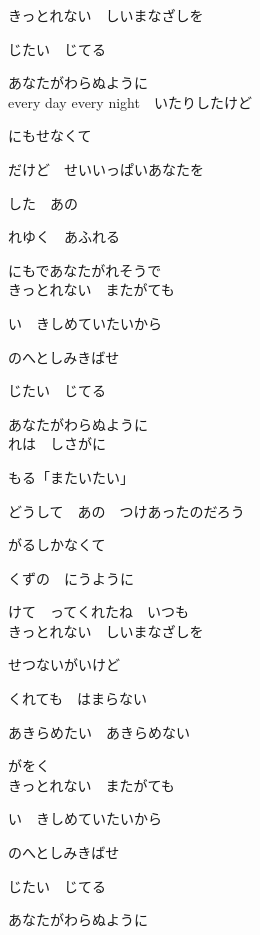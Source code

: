 \large{

きっとれない　しいまなざしを

じたい　じてる

あなたがわらぬように
\\

every day  every night　いたりしたけど

にもせなくて

だけど　せいいっぱいあなたを

した　あの

れゆく　あふれる

にもであなたがれそうで
\\

きっとれない　またがても

い　きしめていたいから

のへとしみきばせ

じたい　じてる

あなたがわらぬように
\\

れは　しさがに

もる「またいたい」

どうして　あの　つけあったのだろう

がるしかなくて

くずの　にうように

けて　ってくれたね　いつも
\\

きっとれない　しいまなざしを

せつないがいけど

くれても　はまらない

あきらめたい　あきらめない

がをく
\\

きっとれない　またがても

い　きしめていたいから

のへとしみきばせ

じたい　じてる

あなたがわらぬように

}